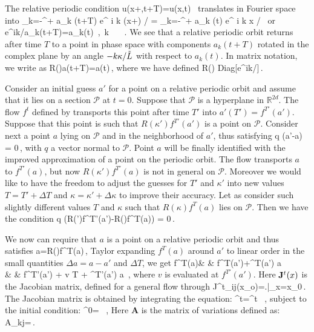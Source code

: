 \documentclass[pre,preprint]{revtex4}%
\begin{document}
The relative periodic condition
\beq
	u(x+\kappa,t+T)=u(x,t) \,
\eeq
translates in Fourier space into
\beq	
	\sum_{k=-\infty}^{+\infty} a_k (t+T) e^{ i k (x+\kappa) / \tildeL} 
		= \sum_{k=-\infty}^{+\infty} a_k (t) e^{ i k x / \tildeL} \,
\eeq
or
\beq
	e^{ik\kappa/\tildeL}a_k(t+T)=a_k(t) \,,\ \forall k \in {}\ \ \ .
	\label{eq:RPOcondition}
\eeq
We see that a relative periodic orbit returns after time $T$ to a point in 
phase space with components $a_k(t+T)$ rotated in the complex plane by an 
angle $-k\kappa/\tilde{L}$ with respect to $a_k(t)$. In matrix notation, we write  as
\beq
	R(\kappa)a(t+T)=a(t)\,,
	\label{eq:RPO}
\eeq
where we have defined
\beq
	R(\kappa) \equiv Diag[e^{ik\kappa/\tildeL}]\,.
\eeq

Consider an initial guess $a'$ for a point on a relative periodic orbit and assume that it lies on
a \Poincare section $\mathcal{P}$ at $t=0$. Suppose that $\mathcal{P}$ is a hyperplane in
$\mathds{R}^{2d}$. The flow $f^t$ defined by  transports 
this point after time $T'$ into $a'(T')=f^{T'}(a')$. Suppose that this point is such that $R(\kappa')f^{T'}(a')$
is a point on $\mathcal{P}$. Consider next a point $a$ lying on $\mathcal{P}$ and in the neighborhood of $a'$,
thus satisfying
\beq
	q \cdot (a'-a) = 0\,,
	\label{eq:cond a}
\eeq
with $q$ a vector normal to $\mathcal{P}$. Point $a$ will be finally identified with the improved 
approximation of a point on the periodic orbit.
The flow transports $a$ to $f^{T'}(a)$, but now $R(\kappa')f^{T'}(a)$ is not in general on $\mathcal{P}$.
Moreover we would like to have the freedom to adjust the guesses for $T'$ and $\kappa'$ into new values
$T=T'+\Delta T$ and $\kappa=\kappa'+\Delta \kappa$ to improve their accuracy. 
Let as consider such slightly different values $T$ and $\kappa$ such that $R(\kappa)f^{T}(a)$ lies on 
$\mathcal{P}$. Then we have the condition
\beq
	q \cdot(R(\kappa')f^{T'}(a')-R(\kappa)f^{T}(a)) = 0\,.
	\label{eq:cond Rf(a)}
\eeq 

 We now can require that $a$ is a point on a relative periodic orbit and thus satisfies 
\beq
	a=R(\kappa)f^{T}(a)\,,
	\label{eq:RPOcond}
\eeq
Taylor expanding $f^{T}(a)$ around $a'$ to linear order in the small quantities 
$\Delta a=a-a'$ and $\Delta T$, we get
\bea
	f^{T}(a)& \simeq & f^{T}(a')+\J^T(a') \Delta a \label{eq:fTaylorl1} \\ 
		& \simeq & f^{T'}(a') + v \Delta T + \J^{T'}(a') \Delta a \label{eq:fTaylorl2} \,, 
\eea
where $v$ is evaluated at $f^{T'}(a')$. Here $\mathbf{J}^t(x)$ is the Jacobian matrix, defined for a general flow through
\beq
   	J^t_{ij}(x_o)=\left.\right|_{x=x_0}\,.
\eeq
The Jacobian matrix is obtained by integrating the equation:
\beq
   	^t=^t \, ,
	\label{eq:Adef}
\eeq
subject to the initial condition:
\beq
   	^0= \, ,
\eeq
Here $\mathbf{A}$ is the matrix of variations defined as:
\beq
	A_{kj}=\,.
\eeq
\end{document}
